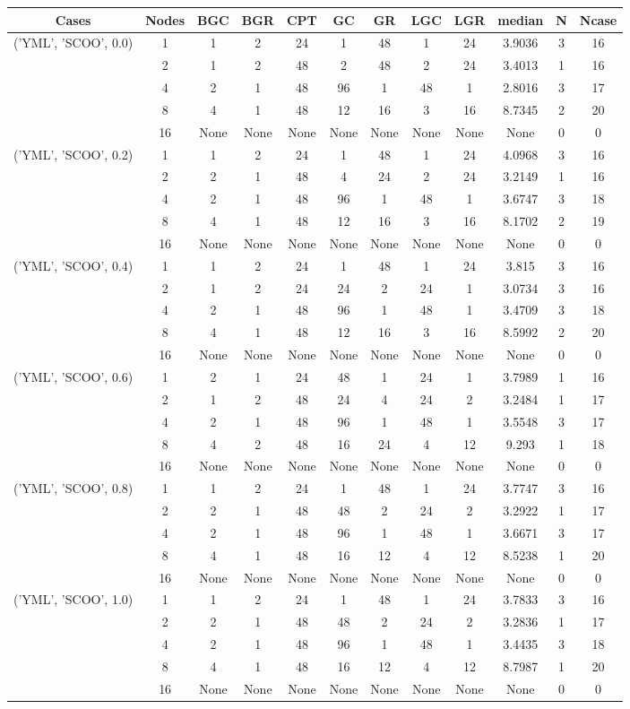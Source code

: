 \begin{tabular}{cccccccccccc}
\hline
Cases & Nodes& BGC& BGR& CPT& GC& GR& LGC& LGR& median & N & Ncase \\
\hline
\multirow{5}{*}{('YML', 'SCOO', 0.0)}& 1& 1& 2& 24& 1& 48& 1& 24& 3.9036& 3& 16\\
& 2& 1& 2& 48& 2& 48& 2& 24& 3.4013& 1& 16\\
& 4& 2& 1& 48& 96& 1& 48& 1& 2.8016& 3& 17\\
& 8& 4& 1& 48& 12& 16& 3& 16& 8.7345& 2& 20\\
& 16& None& None& None& None& None& None& None& None& 0& 0\\
\hline
\multirow{5}{*}{('YML', 'SCOO', 0.2)}& 1& 1& 2& 24& 1& 48& 1& 24& 4.0968& 3& 16\\
& 2& 2& 1& 48& 4& 24& 2& 24& 3.2149& 1& 16\\
& 4& 2& 1& 48& 96& 1& 48& 1& 3.6747& 3& 18\\
& 8& 4& 1& 48& 12& 16& 3& 16& 8.1702& 2& 19\\
& 16& None& None& None& None& None& None& None& None& 0& 0\\
\hline
\multirow{5}{*}{('YML', 'SCOO', 0.4)}& 1& 1& 2& 24& 1& 48& 1& 24& 3.815& 3& 16\\
& 2& 1& 2& 24& 24& 2& 24& 1& 3.0734& 3& 16\\
& 4& 2& 1& 48& 96& 1& 48& 1& 3.4709& 3& 18\\
& 8& 4& 1& 48& 12& 16& 3& 16& 8.5992& 2& 20\\
& 16& None& None& None& None& None& None& None& None& 0& 0\\
\hline
\multirow{5}{*}{('YML', 'SCOO', 0.6)}& 1& 2& 1& 24& 48& 1& 24& 1& 3.7989& 1& 16\\
& 2& 1& 2& 48& 24& 4& 24& 2& 3.2484& 1& 17\\
& 4& 2& 1& 48& 96& 1& 48& 1& 3.5548& 3& 17\\
& 8& 4& 2& 48& 16& 24& 4& 12& 9.293& 1& 18\\
& 16& None& None& None& None& None& None& None& None& 0& 0\\
\hline
\multirow{5}{*}{('YML', 'SCOO', 0.8)}& 1& 1& 2& 24& 1& 48& 1& 24& 3.7747& 3& 16\\
& 2& 2& 1& 48& 48& 2& 24& 2& 3.2922& 1& 17\\
& 4& 2& 1& 48& 96& 1& 48& 1& 3.6671& 3& 17\\
& 8& 4& 1& 48& 16& 12& 4& 12& 8.5238& 1& 20\\
& 16& None& None& None& None& None& None& None& None& 0& 0\\
\hline
\multirow{5}{*}{('YML', 'SCOO', 1.0)}& 1& 1& 2& 24& 1& 48& 1& 24& 3.7833& 3& 16\\
& 2& 2& 1& 48& 48& 2& 24& 2& 3.2836& 1& 17\\
& 4& 2& 1& 48& 96& 1& 48& 1& 3.4435& 3& 18\\
& 8& 4& 1& 48& 16& 12& 4& 12& 8.7987& 1& 20\\
& 16& None& None& None& None& None& None& None& None& 0& 0\\
\hline
\end{tabular}


